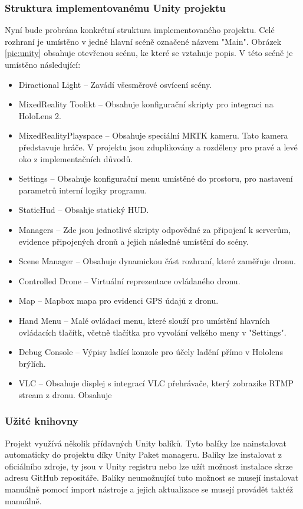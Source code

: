 \subsubsection{Struktura implementovanému Unity projektu}
Nyní bude probrána konkrétní struktura implementovaného projektu. Celé rozhraní je umístěno v jedné hlavní scéně označené názvem "Main". Obrázek \ref{pic:unity} obsahuje otevřenou scénu, ke které se vztahuje popis. V této scéně je umístěno následující:
\begin{itemize}
    \item Diractional Light -- Zavádí všesměrové osvícení scény. 
    \item MixedReality Toolikt -- Obsahuje konfigurační skripty pro integraci na HoloLens 2.
    \item MixedRealityPlayspace -- Obsahuje speciální MRTK kameru. Tato kamera představuje hráče. V projektu jsou zduplikovány a rozděleny pro pravé a levé oko z implementačních důvodů.
    \item Settings -- Obsahuje konfigurační menu umístěné do prostoru, pro nastavení parametrů interní logiky programu.
    \item StaticHud --  Obsahje statický HUD.
    \item Managers -- Zde jsou jednotlivé skripty odpovědné za připojení k serverům, evidence připojených dronů a jejich následné umístění do scény.
    \item Scene Manager -- Obsahuje dynamickou část rozhraní, které zaměřuje dronu.
    \item Controlled Drone --  Virtuální reprezentace ovládaného dronu.
    \item Map -- Mapbox mapa pro evidenci GPS údajů z dronu.
    \item Hand Menu -- Malé ovládací menu, které slouží pro umístění hlavních ovládacích tlačítk, včetně tlačítka pro vyvolání velkého meny v "Settings".
    \item Debug Console -- Výpisy ladící konzole pro účely ladění přímo v Hololens brýlích.
    \item VLC -- Obsahuje displej s integrací VLC přehrávače, který zobrazike  RTMP stream z dronu. Obsahuje  
\end{itemize}

\subsubsection{Užité knihovny}\label{subsec:knihovny}
Projekt využívá několik přídavných Unity balíků. Tyto balíky lze nainstalovat automaticky do projektu díky Unity Paket manageru. Balíky lze instalovat z oficiálního zdroje, ty jsou v Unity registru nebo lze užít možnost instalace skrze adresu GitHub repositáře. Balíky neumožnující tuto možnost se musejí instalovat manuálně pomocí import nástroje a jejich aktualizace se musejí provádět taktéž manuálně.

